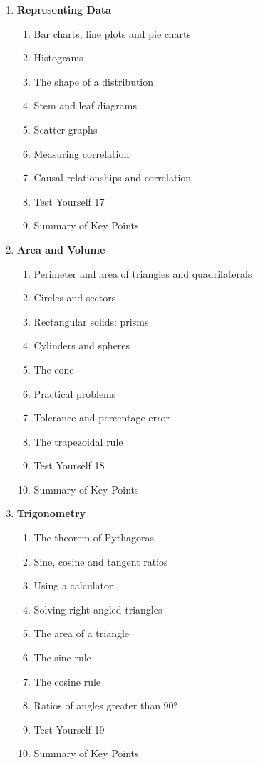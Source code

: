 \documentclass{article}
\begin{document}
\begin{enumerate}
    \item \textbf{Representing Data}
    \begin{enumerate}
        \item Bar charts, line plots and pie charts
        \item Histograms
        \item The shape of a distribution
        \item Stem and leaf diagrams
        \item Scatter graphs
        \item Measuring correlation
        \item Causal relationships and correlation
        \item Test Yourself 17
        \item Summary of Key Points
    \end{enumerate}

    \item \textbf{Area and Volume}
    \begin{enumerate}
        \item Perimeter and area of triangles and quadrilaterals
        \item Circles and sectors
        \item Rectangular solids: prisms
        \item Cylinders and spheres
        \item The cone
        \item Practical problems
        \item Tolerance and percentage error
        \item The trapezoidal rule
        \item Test Yourself 18
        \item Summary of Key Points
    \end{enumerate}

    \item \textbf{Trigonometry}
    \begin{enumerate}
        \item The theorem of Pythagoras
        \item Sine, cosine and tangent ratios
        \item Using a calculator
        \item Solving right-angled triangles
        \item The area of a triangle
        \item The sine rule
        \item The cosine rule
        \item Ratios of angles greater than 90°
        \item Test Yourself 19
        \item Summary of Key Points
    \end{enumerate}


\end{enumerate}
\end{document}
